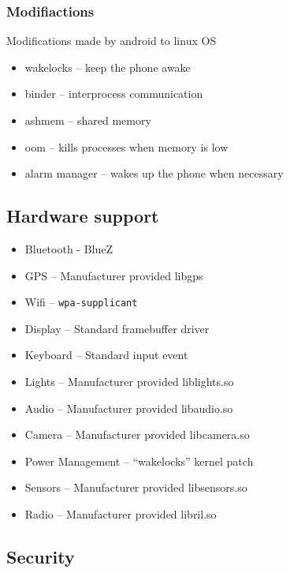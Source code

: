 \documentclass{article}
\begin{document}
\begin{multicols}{2}

\subsubsection{Modifiactions}

\begin{flushleft}
  Modifications made by android to linux OS
\end{flushleft}
\begin{itemize}
  \item wakelocks – keep the phone awake
  \item binder – interprocess communication
  \item ashmem – shared memory
  \item oom – kills processes when memory is low
  \item alarm manager – wakes up the phone when necessary
\end{itemize}

\vfill\null

\subsection{Hardware support}
\begin{itemize}
  \item Bluetooth - BlueZ
  \item GPS – Manufacturer provided libgps
  \item Wifi – \texttt{wpa-supplicant}
  \item Display – Standard framebuffer driver
  \item Keyboard – Standard input event
  \item Lights – Manufacturer provided liblights.so
  \item Audio – Manufacturer provided libaudio.so
  \item Camera – Manufacturer provided libcamera.so
  \item Power Management – “wakelocks” kernel patch
  \item Sensors – Manufacturer provided libsensors.so
  \item Radio – Manufacturer provided libril.so
\end{itemize}

\end{multicols}

\subsection{Security}
\end{document}
